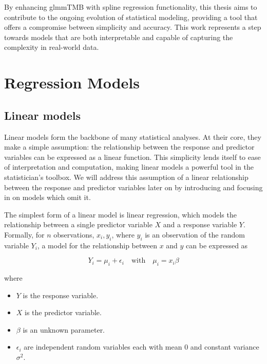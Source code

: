 \documentclass[12pt, twoside,hidelinks]{article}
\theoremstyle{definition}
\numberwithin{equation}{section}
\begin{document}
By enhancing glmmTMB with spline regression functionality, this thesis aims to contribute to the ongoing evolution of statistical modeling, providing a tool that offers a compromise between simplicity and accuracy. This work represents a step towards models that are both interpretable and capable of capturing the complexity in real-world data.


	
\newpage



\newpage

\section{Regression Models}

\subsection{Linear models}

Linear models form the backbone of many statistical analyses. At their core, they make a simple assumption: the relationship between the response and predictor variables can be expressed as a linear function. This simplicity lends itself to ease of interpretation and computation, making linear models a powerful tool in the statistician's toolbox. We will address this assumption of a linear relationship between the response and predictor variables later on by introducing and focusing in on models which omit it. 

The simplest form of a linear model is linear regression, which models the relationship between a single predictor variable \(X\) and a response variable \(Y\). Formally, for $n$ observations, $x_i, y_i$, where $y_i$ is an observation of the random variable $Y_i$, a model for the relationship between $x$ and $y$ can be expressed as

\[ Y_i = \mu_i + \epsilon_i \quad \text{with} \quad \mu_i = x_i\beta \]

where

\begin{itemize}
\item \(Y\) is the response variable.
\item \(X\) is the predictor variable.
\item \(\beta\) is an unknown parameter.
\item \(\epsilon_i\) are independent random variables each with mean 0 and constant variance \(\sigma^2\).
\end{itemize}
\end{document}
